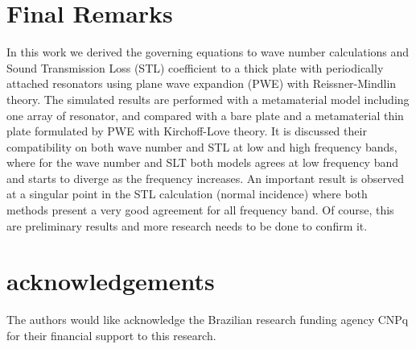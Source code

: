 \documentclass[a4paper]{ICEDyn}
\begin{document}
\section{Final Remarks}
In this work we derived the governing equations to wave number calculations and Sound Transmission Loss (STL) coefficient to a thick plate with periodically attached resonators using plane wave expandion (PWE) with Reissner-Mindlin theory. The simulated results are performed with a metamaterial model including one array of resonator, and compared with a bare plate and a metamaterial thin plate formulated by PWE with Kirchoff-Love theory. It is discussed their compatibility on both wave number and STL at low and high frequency bands, where for the wave number and SLT both models agrees at low frequency band and starts to diverge as the frequency increases. An important result is observed at a singular point in the STL calculation (normal incidence) where both methods present a very good agreement for all frequency band. Of course, this are preliminary results and more research needs to be done to confirm it. 

	    
	\section*{acknowledgements}
	The authors would like acknowledge the Brazilian research funding agency CNPq for their financial support to this research.	
    
\end{document}
